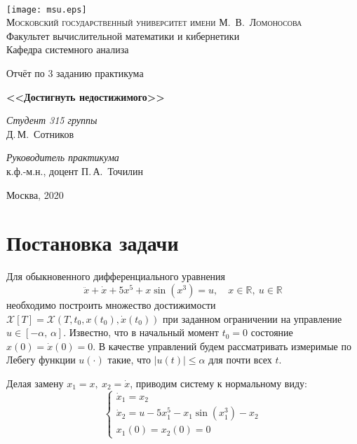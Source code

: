 \documentclass[16pt]{article}
\newcommand\Real{\mathbb{R}}
\newcommand\A{(\cdot)}
\newcommand\X{\mathcal{X}}
\begin{document}
\thispagestyle{empty}

\begin{center}
\ \vspace{-3cm}

\texttt{[image: msu.eps]}\\
{\scshape Московский государственный университет имени М.~В.~Ломоносова}\\
Факультет вычислительной математики и кибернетики\\
Кафедра системного анализа

\vfill

{\LARGE Отчёт по 3 заданию практикума}

\vspace{1cm}

{\Huge\bfseries <<Достигнуть недостижимого>>}
\end{center}

\vspace{1cm}

\begin{flushright}
  \large
  \textit{Студент 315 группы}\\
  Д.\,М.~Сотников

  \vspace{5mm}

  \textit{Руководитель практикума}\\
  к.ф.-м.н., доцент П.\,А.~Точилин
\end{flushright}

\vfill

\begin{center}
Москва, 2020
\end{center}

\newpage
\section{Постановка задачи}
Для обыкновенного дифференциального уравнения
$$\ddot x + \dot x + 5x^5 + x\sin(x^3) = u, \quad x \in \Real,\ u \in \Real$$
необходимо построить множество достижимости $\X[T] = \X(T, t_0, x(t_0), \dot x(t_0))$ при заданном ограничении
на управление $u \in [-\alpha,\, \alpha]$. Известно, что в начальный момент $t_0 = 0$ состояние
$x(0) = \dot x(0) = 0$. В качестве управлений будем рассматривать измеримые по Лебегу функции $u\A$ такие,
что $|u(t)| \leqslant \alpha$ для почти всех $t$.

Делая замену $x_1 = x, \ x_2 = \dot x$, приводим систему к нормальному виду:
\begin{equation}\label{xsys}
\begin{cases}
\dot x_1 = x_2 \\
\dot x_2 = u - 5x_1^5-x_1\sin(x_1^3)-x_2\\
x_1(0) = x_2(0) = 0
\end{cases}
\end{equation}
\end{document}
